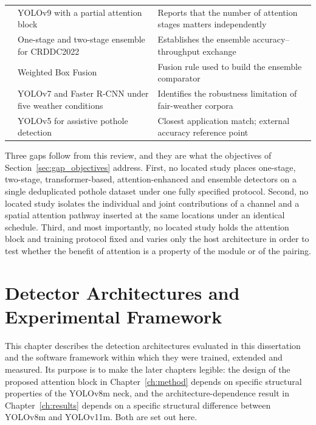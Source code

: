 \documentclass[MScCS]{uccthesis}
\begin{document}
\begin{xltabular}{\textwidth}{@{}>{\raggedright\arraybackslash}p{3.4cm}
                                 >{\raggedright\arraybackslash}p{3.6cm}
                                 >{\raggedright\arraybackslash}X@{}}
   & YOLOv9 with a partial attention block
   & Reports that the number of attention stages matters independently \\
\addlinespace[3pt]
\textcite{ding2022ensemble}
   & One-stage and two-stage ensemble for CRDDC2022
   & Establishes the ensemble accuracy--throughput exchange \\
\addlinespace[3pt]
\textcite{solovyev2021weighted}
   & Weighted Box Fusion
   & Fusion rule used to build the ensemble comparator \\
\addlinespace[3pt]
\textcite{frnda2024analysis}
   & YOLOv7 and Faster R-CNN under five weather conditions
   & Identifies the robustness limitation of fair-weather corpora \\
\addlinespace[3pt]
\textcite{paramarthalingam2024pothole}
   & YOLOv5 for assistive pothole detection
   & Closest application match; external accuracy reference point \\
\end{xltabular}
\endgroup

Three gaps follow from this review, and they are what the objectives of
Section~\ref{sec:gap_objectives} address. First, no located study places
one-stage, two-stage, transformer-based, attention-enhanced and ensemble
detectors on a single deduplicated pothole dataset under one fully specified
protocol. Second, no located study isolates the individual and joint
contributions of a channel and a spatial attention pathway inserted at the same
locations under an identical schedule. Third, and most importantly,
no located study holds the attention block and training protocol fixed and
varies only the host architecture in order to test whether the benefit of
attention is a property of the module or of the pairing.



\chapter{Detector Architectures and Experimental Framework}
\label{ch:architectures}

This chapter describes the detection architectures evaluated in this
dissertation and the software framework within which they were trained,
extended and measured. Its purpose is to make the later chapters legible: the
design of the proposed attention block in Chapter~\ref{ch:method} depends on
specific structural properties of the YOLOv8m neck, and the
architecture-dependence result in Chapter~\ref{ch:results} depends on a
specific structural difference between YOLOv8m and YOLOv11m. Both are set out
here.
\end{document}
